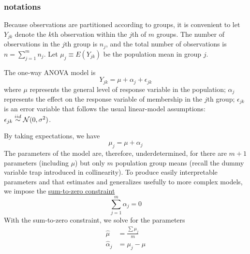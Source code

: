\subsubsection*{notations}
Because observations are partitioned according to groups, it is convenient to let $Y_{jk}$ denote the $k$th observation within the $j$th of $m$ groups.
The number of observations in the $j$th group is $n_j$, and the total number of observations is $n = \sum_{j = 1}^{m} n_j$.
Let $\mu_j\equiv \mathit{E}(Y_{jk})$ be the population mean in group $j$.

The one-way ANOVA model is
$$
Y_{jk} = \mu + \alpha_j + \epsilon_{jk}
$$
where $\mu$ represents the general level of response variable in the population; $\alpha_j$ represents the effect on the response variable of membership in the $j$th group;
$\epsilon_{jk}$ is an error variable that follows the usual linear-model assumptions: $\epsilon_{jk} \overset{iid}{\sim} \mathcal{N}(0, \sigma^2)$.

By taking expectations, we have
$$
	\mu_j = \mu + \alpha_j
$$
The parameters of the model are, therefore, underdetermined, for there are $m+1$ parameters (including $\mu$) but only $m$ population group means (recall the dummy variable trap introduced in collinearity).
To produce easily interpretable parameters and that estimates and generalizes usefully to more complex models, we impose the \underline{sum-to-zero constraint}
$$
\sum\limits_{j=1}^m \alpha_j = 0
$$
With the sum-to-zero constraint, we solve for the parameters
$$
\begin{aligned}
	\hat{\mu} &= \frac{\sum \mu_j}{m} \\
	\hat{\alpha}_j &= \mu_j - \mu\\
\end{aligned}
$$

